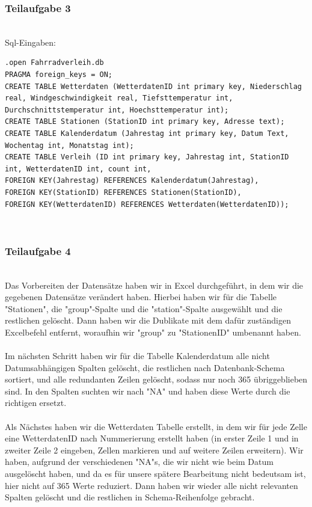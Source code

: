 \documentclass[a4paper,12pt]{article}
\begin{document}
\subsubsection{Teilaufgabe 3}\\
Sql-Eingaben: 
\begin{lstlisting}
.open Fahrradverleih.db
PRAGMA foreign_keys = ON;
CREATE TABLE Wetterdaten (WetterdatenID int primary key, Niederschlag real, Windgeschwindigkeit real, Tiefsttemperatur int, Durchschnittstemperatur int, Hoechsttemperatur int);
CREATE TABLE Stationen (StationID int primary key, Adresse text);
CREATE TABLE Kalenderdatum (Jahrestag int primary key, Datum Text, Wochentag int, Monatstag int);
CREATE TABLE Verleih (ID int primary key, Jahrestag int, StationID int, WetterdatenID int, count int, 
FOREIGN KEY(Jahrestag) REFERENCES Kalenderdatum(Jahrestag), 
FOREIGN KEY(StationID) REFERENCES Stationen(StationID), 
FOREIGN KEY(WetterdatenID) REFERENCES Wetterdaten(WetterdatenID));
\end{lstlisting}
\\ \subsubsection{Teilaufgabe 4} \\
Das Vorbereiten der Datensätze haben wir in Excel durchgeführt, in dem wir die gegebenen Datensätze verändert haben. Hierbei haben wir für die Tabelle "Stationen", die "group"-Spalte und die "station"-Spalte ausgewählt und die restlichen gelöscht. Dann haben wir die Dublikate mit dem dafür zuständigen Excelbefehl entfernt, woraufhin wir "group" zu "StationenID" umbenannt haben. \\ \\
Im nächsten Schritt haben wir für die Tabelle Kalenderdatum alle nicht Datumsabhängigen Spalten gelöscht, die restlichen nach Datenbank-Schema sortiert, und alle redundanten Zeilen gelöscht, sodass nur noch 365 übriggeblieben sind. In den Spalten suchten wir nach "NA" und haben diese Werte durch die richtigen ersetzt.\\ \\
Als Nächstes haben wir die Wetterdaten Tabelle erstellt, in dem wir für jede Zelle eine WetterdatenID nach Nummerierung erstellt haben (in erster Zeile 1 und in zweiter Zeile 2 eingeben, Zellen markieren und auf weitere Zeilen erweitern). Wir haben, aufgrund der verschiedenen "NA"s, die wir nicht wie beim Datum ausgelöscht haben, und da es für unsere spätere Bearbeitung nicht bedeutsam ist, hier nicht auf 365 Werte reduziert. Dann haben wir wieder alle nicht relevanten Spalten gelöscht und die restlichen in Schema-Reihenfolge gebracht.\\ \\
\end{document}
